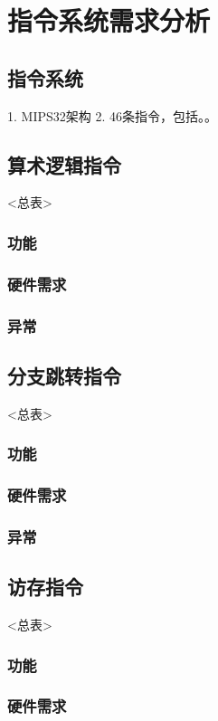 \chapter{指令系统需求分析}

\section{指令系统}

1. MIPS32架构
2. 46条指令，包括。。

\section{算术逻辑指令}
<总表>
    \subsection{功能}
    \subsection{硬件需求}
    \subsection{异常}

\section{分支跳转指令}
<总表>
    \subsection{功能}
    \subsection{硬件需求}
    \subsection{异常}

\section{访存指令}
<总表>
    \subsection{功能}
    \subsection{硬件需求}
